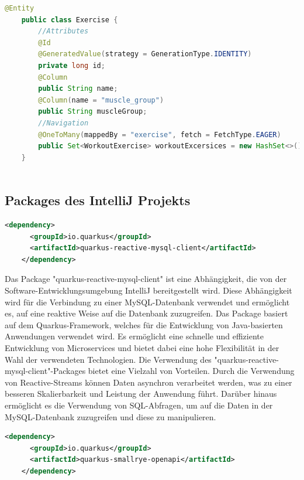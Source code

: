 \begin{lstlisting}[language=Java,caption=Entity | Exersice,label=lst:impl:foo]
    @Entity
    public class Exercise {
        //Attributes
        @Id
        @GeneratedValue(strategy = GenerationType.IDENTITY)
        private long id;  
        @Column
        public String name;
        @Column(name = "muscle_group")
        public String muscleGroup;
        //Navigation
        @OneToMany(mappedBy = "exercise", fetch = FetchType.EAGER)
        public Set<WorkoutExercise> workoutExcersices = new HashSet<>();
    }
    
\end{lstlisting}

\newpage
\subsection{Packages des IntelliJ Projekts}

\begin{lstlisting}[language=XML,caption=Dependency | reactive-mysql-client,label=lst:impl:foo]
    <dependency>
      <groupId>io.quarkus</groupId>
      <artifactId>quarkus-reactive-mysql-client</artifactId>
    </dependency>
\end{lstlisting}

Das Package "quarkus-reactive-mysql-client" \cite{VertxMySQL} ist eine Abhängigkeit, die von der Software-Entwicklungsumgebung IntelliJ bereitgestellt wird. Diese Abhängigkeit wird für die Verbindung zu einer MySQL-Datenbank verwendet und ermöglicht es, auf eine reaktive Weise auf die Datenbank zuzugreifen.
\newline
\newline
Das Package basiert auf dem Quarkus-Framework, welches für die Entwicklung von Java-basierten Anwendungen verwendet wird. Es ermöglicht eine schnelle und effiziente Entwicklung von Microservices und bietet dabei eine hohe Flexibilität in der Wahl der verwendeten Technologien.
\newline
\newline
Die Verwendung des "quarkus-reactive-mysql-client"-Packages bietet eine Vielzahl von Vorteilen. Durch die Verwendung von Reactive-Streams können Daten asynchron verarbeitet werden, was zu einer besseren Skalierbarkeit und Leistung der Anwendung führt. Darüber hinaus ermöglicht es die Verwendung von SQL-Abfragen, um auf die Daten in der MySQL-Datenbank zuzugreifen und diese zu manipulieren.

\begin{lstlisting}[language=XML,caption=Dependency | smallrye-openapi,label=lst:impl:foo]
    <dependency>
      <groupId>io.quarkus</groupId>
      <artifactId>quarkus-smallrye-openapi</artifactId>
    </dependency>
\end{lstlisting}

